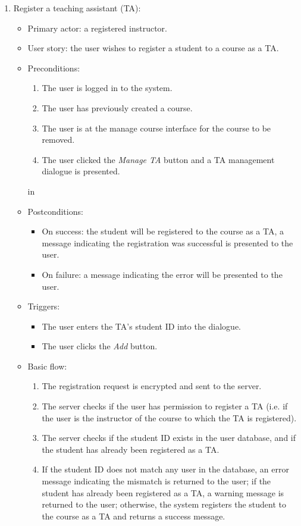 \begin{enumerate}
\item Register a teaching assistant (TA):
\begin{itemize}
    \item Primary actor: a registered instructor.
    \item User story: the user wishes to register a student to a course as a
        TA.
    \item Preconditions:
        \begin{enumerate}
            \item The user is logged in to the system.
            \item The user has previously created a course.
            \item The user is at the manage course interface for the course
                to be removed.
            \item The user clicked the \emph{Manage TA} button and a TA
                management dialogue is presented.
        \end{enumerate}
         in
    \item Postconditions:
        \begin{itemize}
            \item On success: the student will be registered to the course
                as a TA, a message indicating the registration was
                successful is presented to the user.
            \item On failure: a message indicating the error will be presented
                to the user.
        \end{itemize}
    \item Triggers:
        \begin{itemize}
            \item The user enters the TA's student ID into the dialogue.
            \item The user clicks the \emph{Add} button.
        \end{itemize}
    \item Basic flow:
        \begin{enumerate}
            \item The registration request is encrypted and sent to the server.
            \item The server checks if the user has permission to register a
                TA (i.e. if the user is the instructor of the course to which
                the TA is registered).
            \item The server checks if the student ID exists in the user
                database, and if the student has already been registered as a TA.
            \item If the student ID does not match any user in the database, 
                an error message indicating the mismatch is returned to the
                user;
                if the student has already been registered as a TA, a warning
                message is returned to the user; otherwise, the system registers
                the student to the course as a TA and returns a success message.
        \end{enumerate}
\end{itemize}


\end{enumerate}
